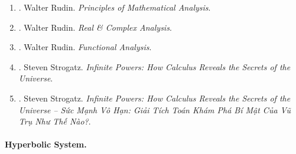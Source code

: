\documentclass{article}
\begin{document}
\begin{enumerate}
	\item \cite{Rudin1976}. {\sc Walter Rudin}. {\it Principles of Mathematical Analysis}.\hfill{\sf[done]}
	
	\item \cite{Rudin1987}. {\sc Walter Rudin}. {\it Real \& Complex Analysis}.
	
	\item \cite{Rudin1991}. {\sc Walter Rudin}. {\it Functional Analysis}.
	
	\item \cite{Strogatz_infinite_power}. {\sc Steven Strogatz}. {\it Infinite Powers: How Calculus Reveals the Secrets of the Universe}.
	
	\item \cite{Strogatz_infinite_power_VN}. {\sc Steven Strogatz}. {\it Infinite Powers: How Calculus Reveals the Secrets of the Universe -- Sức Mạnh Vô Hạn: Giải Tích Toán Khám Phá Bí Mật Của Vũ Trụ Như Thế Nào?}.\hfill{\sf[done]}
\end{enumerate}

\paragraph{Hyperbolic System.}
\end{document}
